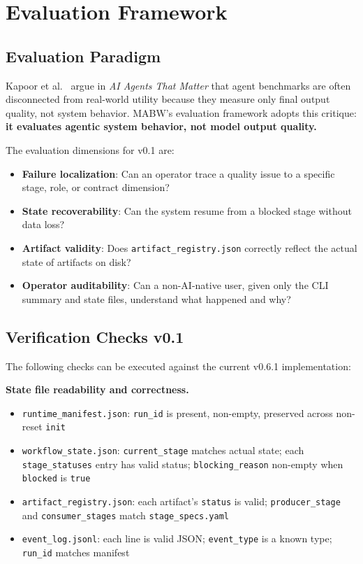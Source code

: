 \documentclass[11pt,a4paper]{article}
\begin{document}
\section{Evaluation Framework}
\label{sec:evaluation}

\subsection{Evaluation Paradigm}

Kapoor et al.~\cite{kapoor2024agents} argue in \textit{AI Agents That Matter} that agent benchmarks are often disconnected from real-world utility because they measure only final output quality, not system behavior. MABW's evaluation framework adopts this critique: \textbf{it evaluates agentic system behavior, not model output quality.}

The evaluation dimensions for v0.1 are:

\begin{itemize}[leftmargin=*,itemsep=2pt]
    \item \textbf{Failure localization}: Can an operator trace a quality issue to a specific stage, role, or contract dimension?
    \item \textbf{State recoverability}: Can the system resume from a blocked stage without data loss?
    \item \textbf{Artifact validity}: Does \texttt{artifact\_registry.json} correctly reflect the actual state of artifacts on disk?
    \item \textbf{Operator auditability}: Can a non-AI-native user, given only the CLI summary and state files, understand what happened and why?
\end{itemize}

\subsection{Verification Checks v0.1}

The following checks can be executed against the current v0.6.1 implementation:

\textbf{State file readability and correctness.}
\begin{itemize}[leftmargin=*,itemsep=1pt]
    \item \texttt{runtime\_manifest.json}: \texttt{run\_id} is present, non-empty, preserved across non-reset \texttt{init}
    \item \texttt{workflow\_state.json}: \texttt{current\_stage} matches actual state; each \texttt{stage\_statuses} entry has valid status; \texttt{blocking\_reason} non-empty when \texttt{blocked} is \texttt{true}
    \item \texttt{artifact\_registry.json}: each artifact's \texttt{status} is valid; \texttt{producer\_stage} and \texttt{consumer\_stages} match \texttt{stage\_specs.yaml}
    \item \texttt{event\_log.jsonl}: each line is valid JSON; \texttt{event\_type} is a known type; \texttt{run\_id} matches manifest
\end{itemize}
\end{document}
